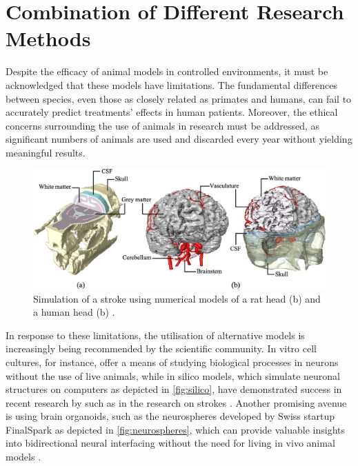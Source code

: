 \documentclass[10pt]{article}
\begin{document}
\begin{sloppypar}
  \section{Combination of Different Research Methods}
  \label{sec:discussion}

  Despite the efficacy of animal models in controlled environments, it must be acknowledged that these models have limitations. The fundamental differences between species, even those as closely related as primates and humans, can fail to accurately predict treatments’ effects in human patients. Moreover, the ethical concerns surrounding the use of animals in research must be addressed, as significant numbers of animals are used and discarded every year without yielding meaningful results.

  \vspace{10pt} %
  \begin{figure}[ht]
    \centering
    \includegraphics[width=\textwidth]{figures/in-silico.jpg}
    \caption[Simulation of a stroke using numerical models of a rat head and a human head]{Simulation of a stroke using numerical models of a rat head (b) and a human head (b) \citep{bing_medical_2020}.}
    \label{fig:silico}
  \end{figure}

  In response to these limitations, the utilisation of alternative models is increasingly being recommended by the scientific community. In vitro cell cultures, for instance, offer a means of studying biological processes in neurons without the use of live animals, while in silico models, which simulate neuronal structures on computers as depicted in \autoref{fig:silico}, have demonstrated success in recent research by such as in the research on strokes \citep{bing_medical_2020}. Another promising avenue is using brain organoids, such as the neurospheres developed by Swiss startup FinalSpark as depicted in \autoref{fig:neurospheres}, which can provide valuable insights into bidirectional neural interfacing without the need for living in vivo animal models \citep{finalspark_artificial_2022}.


\end{sloppypar}
\end{document}
